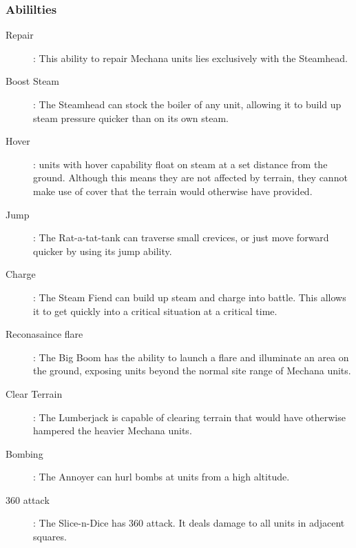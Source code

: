 \documentclass[a4paper,twocolumn]{article}
\begin{document}
\subsubsection{Abililties}
\begin{description}
\item[Repair]: This ability to repair Mechana units lies exclusively with the Steamhead.
\item[Boost Steam]: The Steamhead can stock the boiler of any unit, allowing it to build up steam pressure quicker than on its own steam.
\item[Hover]: units with hover capability float on steam at a set distance from the ground. Although this means they are not affected by terrain, they cannot make use of cover that the terrain would otherwise have provided.
\item[Jump]: The Rat-a-tat-tank can traverse small crevices, or just move forward quicker by using its jump ability.
\item[Charge]: The Steam Fiend can build up steam and charge into battle. This allows it to get quickly into a critical situation at a critical time.
\item[Reconasaince flare]: The Big Boom has the ability to launch a flare and illuminate an area on the ground, exposing units beyond the normal site range of Mechana units.
\item[Clear Terrain]: The Lumberjack is capable of clearing terrain that would have otherwise hampered the heavier Mechana units.
\item[Bombing]: The Annoyer can hurl bombs at units from a high altitude.
\item[360 attack]: The Slice-n-Dice has 360 attack. It deals damage to all units in adjacent squares.
\end{description}
\end{document}
